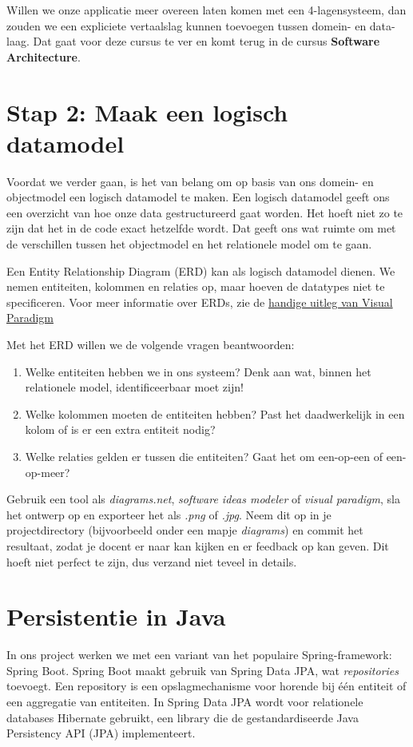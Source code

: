 Willen we onze applicatie meer overeen laten komen met een 
4-lagensysteem, dan zouden we een expliciete 
vertaalslag kunnen toevoegen tussen domein- en data-laag. 
Dat gaat voor deze cursus te ver en komt terug in de cursus 
\textbf{Software Architecture}.

\section{Stap 2: Maak een logisch datamodel}
Voordat we verder gaan, is het van belang om op basis van 
ons domein- en objectmodel een logisch datamodel te maken. 
Een logisch datamodel geeft ons een overzicht van hoe onze 
data gestructureerd gaat worden. Het hoeft niet zo te zijn 
dat het in de code exact hetzelfde wordt. Dat geeft ons wat 
ruimte om met de verschillen tussen het objectmodel en het 
relationele model om te gaan.

Een Entity Relationship Diagram (ERD) kan als logisch datamodel dienen.
We nemen entiteiten, kolommen en relaties op, 
maar hoeven de datatypes niet te specificeren.
Voor meer informatie over ERDs, zie de 
\href{https://www.visual-paradigm.com/guide/data-modeling/what-is-entity-relationship-diagram/#erd-data-models-conceptual}{handige uitleg van Visual Paradigm}

Met het ERD willen we de volgende vragen beantwoorden:
\begin{enumerate}
    \item Welke entiteiten hebben we in ons systeem? 
    Denk aan wat, binnen het relationele model, identificeerbaar moet zijn!
    \item Welke kolommen moeten de entiteiten hebben?
    Past het daadwerkelijk in een kolom of is er een extra entiteit nodig?
    \item Welke relaties gelden er tussen die entiteiten?
    Gaat het om een-op-een of een-op-meer?
\end{enumerate}

Gebruik een tool als \textit{diagrams.net}, \textit{software ideas modeler} of \textit{visual paradigm},
sla het ontwerp op en exporteer het als \textit{.png} of \textit{.jpg}. 
Neem dit op in je projectdirectory (bijvoorbeeld onder een mapje \textit{diagrams})
en commit het resultaat, zodat je docent er naar kan kijken en er feedback op kan geven.
Dit hoeft niet perfect te zijn, dus verzand niet teveel in details.

\newpage
\section{Persistentie in Java}
In ons project werken we met een variant van het populaire Spring-framework:
Spring Boot. Spring Boot maakt gebruik van Spring Data JPA, wat \textit{repositories} toevoegt.
Een repository is een opslagmechanisme voor horende bij één entiteit of een aggregatie van entiteiten. 
In Spring Data JPA wordt voor relationele databases Hibernate gebruikt, 
een library die de gestandardiseerde Java Persistency API (JPA) implementeert.

